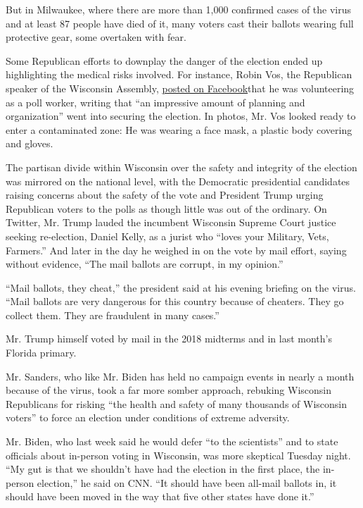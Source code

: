 But in Milwaukee, where there are more than 1,000 confirmed cases of the
virus and at least 87 people have died of it, many voters cast their
ballots wearing full protective gear, some overtaken with fear.

Some Republican efforts to downplay the danger of the election ended up
highlighting the medical risks involved. For instance, Robin Vos, the
Republican speaker of the Wisconsin Assembly,
\href{https://www.facebookcorewwwi.onion/SpeakerVos/posts/2864610826921333?__tn__=-R}{posted
on Facebook}that he was volunteering as a poll worker, writing that ``an
impressive amount of planning and organization'' went into securing the
election. In photos, Mr. Vos looked ready to enter a contaminated zone:
He was wearing a face mask, a plastic body covering and gloves.

The partisan divide within Wisconsin over the safety and integrity of
the election was mirrored on the national level, with the Democratic
presidential candidates raising concerns about the safety of the vote
and President Trump urging Republican voters to the polls as though
little was out of the ordinary. On Twitter, Mr. Trump lauded the
incumbent Wisconsin Supreme Court justice seeking re-election, Daniel
Kelly, as a jurist who ``loves your Military, Vets, Farmers.'' And later
in the day he weighed in on the vote by mail effort, saying without
evidence, ``The mail ballots are corrupt, in my opinion.''

``Mail ballots, they cheat,'' the president said at his evening briefing
on the virus. ``Mail ballots are very dangerous for this country because
of cheaters. They go collect them. They are fraudulent in many cases.''

Mr. Trump himself voted by mail in the 2018 midterms and in last month's
Florida primary.

Mr. Sanders, who like Mr. Biden has held no campaign events in nearly a
month because of the virus, took a far more somber approach, rebuking
Wisconsin Republicans for risking ``the health and safety of many
thousands of Wisconsin voters'' to force an election under conditions of
extreme adversity.

Mr. Biden, who last week said he would defer ``to the scientists'' and
to state officials about in-person voting in Wisconsin, was more
skeptical Tuesday night. ``My gut is that we shouldn't have had the
election in the first place, the in-person election,'' he said on CNN.
``It should have been all-mail ballots in, it should have been moved in
the way that five other states have done it.''

